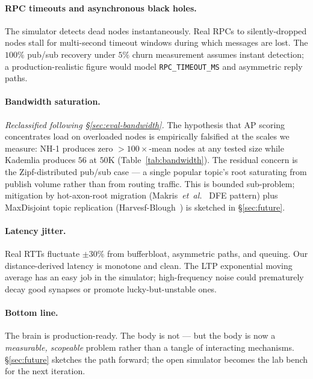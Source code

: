 \documentclass[conference]{IEEEtran}
\newcommand{\nhone}{NH-1\xspace}
\begin{document}
\paragraph{RPC timeouts and asynchronous black holes.} The simulator
detects dead nodes instantaneously. Real RPCs to silently-dropped
nodes stall for multi-second timeout windows during which messages
are lost. The $100\%$ pub/sub recovery under $5\%$ churn measurement
assumes instant detection; a production-realistic figure would model
\texttt{RPC\_TIMEOUT\_MS} and asymmetric reply paths.

\paragraph{Bandwidth saturation.} \emph{Reclassified
following \S\ref{sec:eval-bandwidth}.} The hypothesis that AP
scoring concentrates load on overloaded nodes is empirically
falsified at the scales we measure: \nhone produces zero
$>100\times$-mean nodes at any tested size while Kademlia produces
$56$ at $50\mathrm{K}$ (Table~\ref{tab:bandwidth}). The residual
concern is the Zipf-distributed pub/sub case --- a single popular
topic's root saturating from publish volume rather than from routing
traffic. This is bounded sub-problem; mitigation by hot-axon-root
migration (Makris~\emph{et~al.}~\cite{makris2017novel} DFE pattern)
plus MaxDisjoint topic replication
(Harvesf-Blough~\cite{harvesf2007design}) is sketched
in \S\ref{sec:future}.

\paragraph{Latency jitter.} Real RTTs fluctuate $\pm 30\%$ from
bufferbloat, asymmetric paths, and queuing. Our distance-derived
latency is monotone and clean. The LTP exponential moving average has
an easy job in the simulator; high-frequency noise could prematurely
decay good synapses or promote lucky-but-unstable ones.

\paragraph{Bottom line.} The brain is production-ready. The body
is not --- but the body is now a \emph{measurable, scopeable} problem
rather than a tangle of interacting mechanisms.
\S\ref{sec:future} sketches the path forward; the open simulator
becomes the lab bench for the next iteration.

\end{document}
